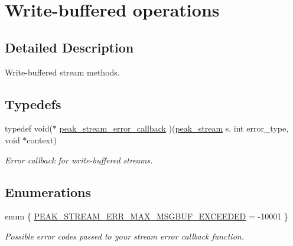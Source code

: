 \hypertarget{group__stream__buf}{
\section{Write-buffered operations}
\label{group__stream__buf}
}


\subsection{Detailed Description}
Write-buffered stream methods. 



\subsection*{Typedefs}
\begin{CompactItemize}
\item 
typedef void($\ast$ \hyperlink{group__stream__buf_ga0}{peak\_\-stream\_\-error\_\-callback} )(\hyperlink{group__stream_ga0}{peak\_\-stream} s, int error\_\-type, void $\ast$context)
\begin{CompactList}\small\item\em Error callback for write-buffered streams. \item\end{CompactList}\end{CompactItemize}
\subsection*{Enumerations}
\begin{CompactItemize}
\item 
enum \{ \hyperlink{group__stream__buf_gga8a18}{PEAK\_\-STREAM\_\-ERR\_\-MAX\_\-MSGBUF\_\-EXCEEDED} =  -10001
 \}
\begin{CompactList}\small\item\em Possible error codes passed to your stream error callback function. \item\end{CompactList}\end{CompactItemize}
